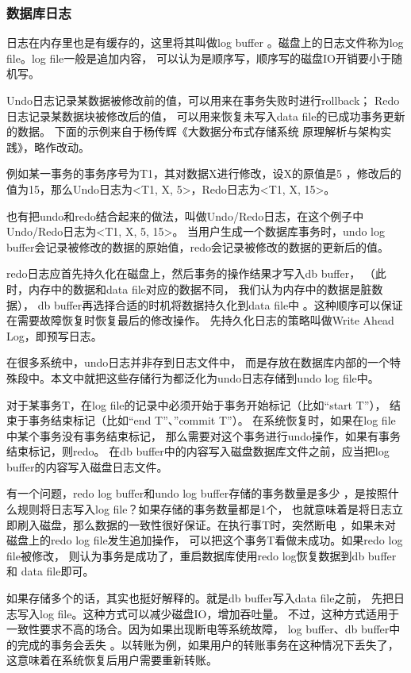 \subsubsection{数据库日志}
日志在内存里也是有缓存的，这里将其叫做log buffer
。磁盘上的日志文件称为log file。log file一般是追加内容，
可以认为是顺序写，顺序写的磁盘IO开销要小于随机写。

Undo日志记录某数据被修改前的值，可以用来在事务失败时进行rollback；
Redo日志记录某数据块被修改后的值，
可以用来恢复未写入data file的已成功事务更新的数据。
下面的示例来自于杨传辉《大数据分布式存储系统 原理解析与架构实践》，略作改动。

例如某一事务的事务序号为T1，其对数据X进行修改，设X的原值是5
，修改后的值为15，那么Undo日志为<T1, X, 5>，Redo日志为<T1, X, 15>。

也有把undo和redo结合起来的做法，叫做Undo/Redo日志，在这个例子中Undo/Redo日志为<T1, X, 5, 15>。
当用户生成一个数据库事务时，undo log buffer会记录被修改的数据的原始值，redo会记录被修改的数据的更新后的值。

redo日志应首先持久化在磁盘上，然后事务的操作结果才写入db buffer，
（此时，内存中的数据和data file对应的数据不同，
我们认为内存中的数据是脏数据），
db buffer再选择合适的时机将数据持久化到data file中
。这种顺序可以保证在需要故障恢复时恢复最后的修改操作。
先持久化日志的策略叫做Write Ahead Log，即预写日志。

在很多系统中，undo日志并非存到日志文件中，
而是存放在数据库内部的一个特殊段中。本文中就把这些存储行为都泛化为undo日志存储到undo log file中。

对于某事务T，在log file的记录中必须开始于事务开始标记（比如“start T”），
结束于事务结束标记（比如“end T”、”commit T”）。
在系统恢复时，如果在log file中某个事务没有事务结束标记，
那么需要对这个事务进行undo操作，如果有事务结束标记，则redo。
在db buffer中的内容写入磁盘数据库文件之前，应当把log buffer的内容写入磁盘日志文件。

有一个问题，redo log buffer和undo log buffer存储的事务数量是多少
，是按照什么规则将日志写入log file？如果存储的事务数量都是1个，
也就意味着是将日志立即刷入磁盘，那么数据的一致性很好保证。在执行事T时，突然断电
，如果未对磁盘上的redo log file发生追加操作，
可以把这个事务T看做未成功。如果redo log file被修改，
则认为事务是成功了，重启数据库使用redo log恢复数据到db buffer和 data file即可。

如果存储多个的话，其实也挺好解释的。就是db buffer写入data file之前，
先把日志写入log file。这种方式可以减少磁盘IO，增加吞吐量。
不过，这种方式适用于一致性要求不高的场合。因为如果出现断电等系统故障，
log buffer、db buffer中的完成的事务会丢失
。以转账为例，如果用户的转账事务在这种情况下丢失了，这意味着在系统恢复后用户需要重新转账。

